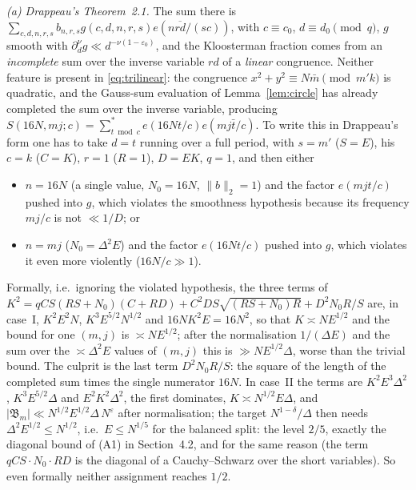 \documentclass[11pt,a4paper]{article}
\theoremstyle{remark}
\theoremstyle{definition}
\newcommand{\e}{\varepsilon}
\begin{document}
\emph{(a) Drappeau's Theorem~2.1.} The sum there is $\sum_{c,d,n,r,s}b_{n,r,s}g(c,d,n,r,s)e(n\overline{rd}/(sc))$, with $c\equiv c_0$, $d\equiv d_0\pmod q$, $g$ smooth with $\partial_d^\nu g\ll d^{-\nu(1-\e_0)}$, and the Kloosterman fraction comes from an \emph{incomplete} sum over the inverse variable $rd$ of a \emph{linear} congruence. Neither feature is present in \eqref{eq:trilinear}: the congruence $x^2+y^2\equiv N\bar m\pmod{m'k}$ is quadratic, and the Gauss-sum evaluation of Lemma~\ref{lem:circle} has already completed the sum over the inverse variable, producing $S(16N,mj;c)=\sum_{t\bmod c}^*e(16Nt/c)e(mj\bar t/c)$. To write this in Drappeau's form one has to take $d=t$ running over a full period, with $s=m'$ ($S=E$), his $c=k$ ($C=K$), $r=1$ ($R=1$), $D=EK$, $q=1$, and then either
\begin{itemize}[leftmargin=1.6em]
\item[I.] $n=16N$ (a single value, $N_0=16N$, $\|b\|_2=1$) and the factor $e(mjt/c)$ pushed into $g$, which violates the smoothness hypothesis because its frequency $mj/c$ is not $\ll1/D$; or
\item[II.] $n=mj$ ($N_0=\Delta^2E$) and the factor $e(16Nt/c)$ pushed into $g$, which violates it even more violently ($16N/c\gg1$).
\end{itemize}
Formally, i.e.\ ignoring the violated hypothesis, the three terms of $K^2=qCS(RS+N_0)(C+RD)+C^2DS\sqrt{(RS+N_0)R}+D^2N_0R/S$ are, in case~I, $K^2E^2N$, $K^3E^{5/2}N^{1/2}$ and $16NK^2E=16N^2$, so that $K\asymp NE^{1/2}$ and the bound for one $(m,j)$ is $\asymp NE^{1/2}$; after the normalisation $1/(\Delta E)$ and the sum over the $\asymp\Delta^2E$ values of $(m,j)$ this is $\gg NE^{1/2}\Delta$, worse than the trivial bound. The culprit is the last term $D^2N_0R/S$: the square of the length of the completed sum times the single numerator $16N$. In case~II the terms are $K^2E^3\Delta^2$, $K^3E^{5/2}\Delta$ and $E^2K^2\Delta^2$, the first dominates, $K\asymp N^{1/2}E\Delta$, and $|\mathfrak B_m|\ll N^{1/2}E^{1/2}\Delta\,N^{\e}$ after normalisation; the target $N^{1-\delta}/\Delta$ then needs $\Delta^2E^{1/2}\le N^{1/2}$, i.e.\ $E\le N^{1/5}$ for the balanced split: the level $2/5$, exactly the diagonal bound of (A1) in Section~4.2, and for the same reason (the term $qCS\cdot N_0\cdot RD$ is the diagonal of a Cauchy--Schwarz over the short variables). So even formally neither assignment reaches $1/2$.
\end{document}
